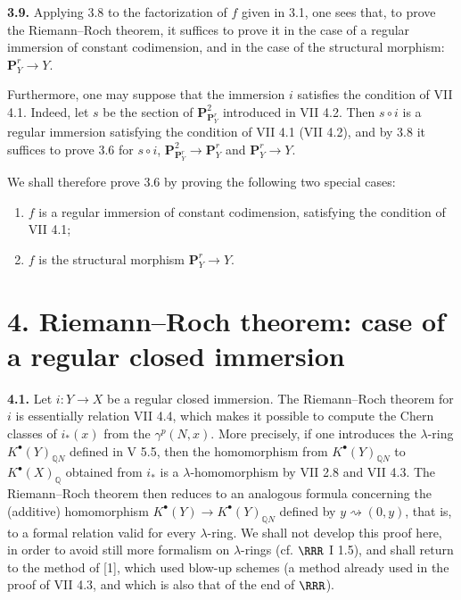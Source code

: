 \textbf{3.9.} Applying 3.8 to the factorization of \(f\) given in 3.1, one sees that, to prove the Riemann--Roch theorem, it suffices to prove it in the case of a regular immersion of constant codimension, and in the case of the structural morphism: $\mathbf{P}^r_Y\longrightarrow Y$.

Furthermore, one may suppose that the immersion \(i\) satisfies the condition of VII 4.1. Indeed, let \(s\) be the section of \(\mathbf{P}^2_{\mathbf{P}^r_Y}\) introduced in VII 4.2. Then \(s\circ i\) is a regular immersion satisfying the condition of VII 4.1 (VII 4.2), and by 3.8 it suffices to prove 3.6 for \(s\circ i\), \(\mathbf{P}^2_{\mathbf{P}^r_Y}\longrightarrow\mathbf{P}^r_Y\) and \(\mathbf{P}^r_Y\longrightarrow Y\).

We shall therefore prove 3.6 by proving the following two special cases:
\begin{enumerate}[label=\roman*)]
\item \(f\) is a regular immersion of constant codimension, satisfying the condition of VII 4.1;

%
\item \(f\) is the
structural morphism \(\mathbf{P}^r_Y\to Y\).
\end{enumerate}

\section*{4. Riemann--Roch theorem: case of a regular closed immersion}

\textbf{4.1.} Let \(i:Y\to X\) be a regular closed immersion. The Riemann--Roch theorem for \(i\) is essentially relation VII 4.4, which makes it possible to compute the Chern classes of \(i_*(x)\) from the \(\gamma^p(N,x)\). More precisely, if one introduces the \(\lambda\)-ring \(K^{\bullet}(Y)_{\mathbb Q N}\) defined in V 5.5, then the homomorphism from \(K^{\bullet}(Y)_{\mathbb Q N}\) to \(K^{\bullet}(X)_{\mathbb Q}\) obtained from \(i_*\) is a \(\lambda\)-homomorphism by VII 2.8 and VII 4.3. The Riemann--Roch theorem then reduces to an analogous formula concerning the (additive) homomorphism \(K^{\bullet}(Y)\longrightarrow K^{\bullet}(Y)_{\mathbb Q N}\) defined by \(y\rightsquigarrow(0,y)\), that is, to a formal relation valid for every \(\lambda\)-ring. We shall not develop this proof here, in order to avoid still more formalism on \(\lambda\)-rings (cf. \(\RRR\) I 1.5), and shall return to the method of [1], which used blow-up schemes (a method already used in the proof of VII 4.3, and which is also that of the end of \(\RRR\)).

